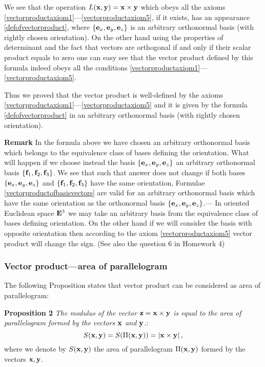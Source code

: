 \documentclass[12pt]{article}
\numberwithin{equation}{section}
\begin{document}
{\footnotesize  We see that the operation $L({\bf x},{\bf y})={\bf x}\times {\bf y}$ which obeys all the axioms
     \eqref{vectorproductaxiom1}---\eqref{vectorproductaxiom5}, if it exists,  has
     an appearance \eqref{defofvectorproduct}, where $\{{\bf e}_x,{\bf e}_y,{\bf e}_z\}$
     is an arbitrary orthonormal basis  (with rightly chosen orientation).
On the other hand  using the properties of determinant and the fact that
  vectors are orthogonal if and only if their scalar product equals to zero
  one can easy see that the vector product defined by this formula
  indeed obeys all the conditions \eqref{vectorproductaxiom1}---\eqref{vectorproductaxiom5}.

  Thus we proved that the vector product is well-defined by the axioms
  \eqref{vectorproductaxiom1}---\eqref{vectorproductaxiom5} and it is given
  by the formula \eqref{defofvectorproduct} in  an arbitrary
  orthonormal basis  (with rightly chosen orientation).}



   {\bf Remark} In the formula above we have chosen an arbitrary orthonormal basis which belongs to the equivalence
  class of bases defining the orientation.  What will happen if we
   choose instead the basis $\{{\bf e}_x,{\bf e}_y,{\bf e}_z\}$
  an arbitrary orthonormal basis $\{{\bf f}_1,{\bf f}_2,{\bf f}_3\}$.
  We see that  such that answer does not change if both bases
  $\{{\bf e}_x,{\bf e}_y,{\bf e}_z\}$ and $\{{\bf f}_1,{\bf f}_2,{\bf f}_3\}$ have the same orientation,
  Formulae \eqref{vectorproductofbasisvectors} are valid for an arbitrary orthonormal basis which have the same orientation as
the orthonormal basis $\{{\bf e}_x,{\bf e}_y,{\bf e}_z\}$.--- In oriented Euclidean space ${\bf E}^3$ we may take an arbitrary basis
from the equivalence class of bases defining orientation.
   On the other hand if we will consider the basis with opposite orientation then according to the axiom
   \eqref{vectorproductaxiom5} vector product will change
  the sign. (See also the question 6 in Homework 4)


\m
  \subsubsection{Vector product---area of parallelogram}

 The following Proposition states that vector 
product can be considered as area of parallelogram:

   {\bf Proposition 2}  {\it The modulus of the vector ${\bf z}={\bf x}\times {\bf y}$ is equal to the area of
   parallelogram formed by the vectors ${\bf x}$ and ${\bf y}$.}:
   \begin{equation}\label{areaofparallelogram}
    S({\bf x},{\bf y})=S(\Pi({\bf x},{\bf y}))=|{\bf x}\times {\bf y}|\,,
\end{equation}
where we denote by  $S({\bf x},{\bf y})$ 
 the area of parallelogram $\Pi({\bf x},{\bf y})$ formed by the vectors ${\bf x},{\bf y}$.
   \m
\end{document}
